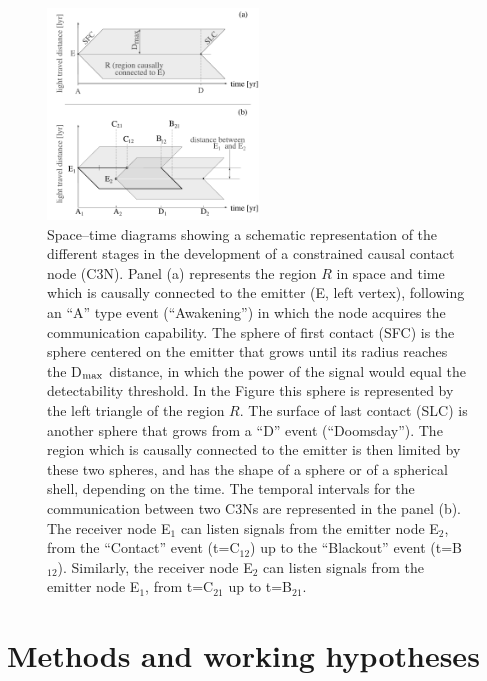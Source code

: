 \documentclass[crop]{CSLB}
\newcommand{\ceti}{C3N}
\newcommand{\cetis}{C3Ns}
\begin{document}
\begin{figure}[!t]
   \centering
   \includegraphics[width=0.5\textwidth]{F_scheme.pdf}
   \caption{
Space--time diagrams showing a schematic representation of the different stages
in the development of a constrained causal contact node (\ceti{}).
%
Panel (a) represents the region $R$ in space and time which is causally
connected to the emitter (E, left vertex), following an ``A'' type
event (``Awakening'') in which the node acquires the communication
capability.
%
The sphere of first contact (SFC) is the sphere centered on the emitter that
grows until its radius reaches the D$_{\rm max}$ distance, in which the
power of the signal would equal the detectability threshold.
%
In the Figure this sphere is represented by the left triangle of the region
$R$.
%
The surface of last contact (SLC) is another sphere that grows from a ``D''
event (``Doomsday'').
%
The region which is causally connected to the emitter is then limited by these
two spheres, and has the shape of a sphere or of a spherical shell,
depending on the time.
%
The temporal intervals for the communication between two \cetis{} are
represented in the panel (b).
%
The receiver node E$_1$ can listen signals from the emitter node E$_2$, from
the ``Contact'' event (t=C$_{12}$) up to the ``Blackout'' event
(t=B$_{12}$).
%
Similarly, the receiver node E$_2$ can listen signals from the emitter
node E$_1$, from t=C$_{21}$ up to t=B$_{21}$. 
%
} \label{F_scheme}
%
\end{figure}



\section{Methods and working hypotheses}\label{S_methods}
\end{document}
